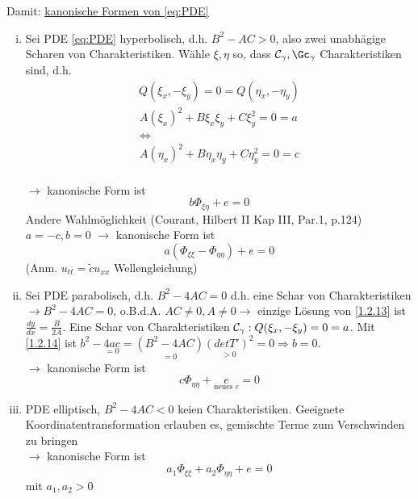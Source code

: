 Damit: \underline{kanonische Formen von \eqref{eq:PDE}}
\begin{enumerate}[(i)]
    \item Sei PDE \eqref{eq:PDE} hyperbolisch, d.h. $B^2-AC>0$, also zwei unabhägige Scharen von Charakteristiken. Wähle $\xi, \eta$ so, dass $\Cc_\gamma, \Gc_\gamma$ Charakteristiken sind, d.h.
        \begin{align*}
           Q(\xi_x,-\xi_y) = 0 = Q(\eta_x,-\eta_y)
        \end{align*}
        \begin{align} %
            A(\xi_x)^2 + B\xi_x\xi_y + C \xi_y^2 = 0 = a\\
            \Leftrightarrow\\
            A(\eta_x)^2 + B\eta_x\eta_y + C\eta_y^2 = 0 = c
            \label{}
        \end{align}\\
        $\to$ kanonische Form ist 
        \begin{equation} %
            b \Phi_{\xi\eta} + e = 0
            \label{}
        \end{equation}
        Andere Wahlmöglichkeit (Courant, Hilbert II Kap III, Par.1, p.124)\\
            $a=-c, b=0$
            $\to$ kanonische Form ist 
            \begin{equation}%
                a(\Phi_{\xi\xi}-\Phi_{\eta\eta}) + e = 0
                \label{}
            \end{equation}
            (Anm. $u_{tt} = \tilde{c} u_{xx}$ Wellengleichung)


        \item Sei PDE parabolisch, d.h. $B^2-4AC = 0$ d.h. eine Schar von Charakteristiken $\to B^2-4AC = 0$, o.B.d.A. $AC\neq 0, A\neq 0 \to$ einzige Lösung von \ref{1.2.13} ist $\frac{dy}{dx} = \frac{B}{2A}$. Eine Schar von Charakteristiken $\mathcal{C}_\gamma: Q(\xi_x, -\xi_y)=0=a$. Mit \eqref{1.2.14} ist $b^2-\underset{=0}{4ac} = \underset{=0}{(B^2-4AC)}\underset{>0}{(det T')^2} = 0 \Rightarrow b=0$.\\
            $\to$ kanonische Form ist
            \begin{equation} %
                c\Phi_{\eta\eta} + \underset{\text{neues } e}{e} = 0
                \label{}
            \end{equation}


            \item PDE elliptisch, $B^2-4AC<0$ keien Charakteristiken. Geeignete Koordinatentransformation erlauben es, gemischte Terme zum Verschwinden zu bringen\\
                $\to$ kanonische Form ist 
                \begin{equation} %
                    a_1\Phi_{\xi\xi} + a_2 \Phi_{\eta\eta} + e = 0
                    \label{}
                \end{equation}
                mit $a_1,a_2 > 0$
\end{enumerate}

